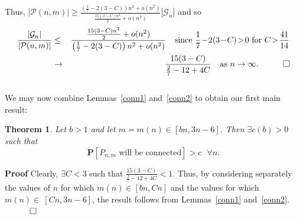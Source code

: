 \documentclass{article}
\newtheorem{Theorem}{Theorem}
\newtheorem{Proof of Theorem}{Proof of Theorem}
\begin{document}
Thus,
$|\mathcal{P}(n,m)| \geq
\frac{(\frac{1}{7} - 2(3-C))n^{2} + o \left( n^{2} \right)}{ \frac{15(3-C)n^{2}}{2} + o \left( n^{2} \right)}
|\mathcal{G}_{n}|$
and so
\begin{eqnarray*}
\frac{|\mathcal{G}_{n}|}{|\mathcal{P}(n,m)|} & \leq & \frac{\frac{15(3-C)n^{2}}{2} + o(n^{2})}
{\left( \frac{1}{7}-2(3-C) \right) n^{2} + o(n^{2})} 
\phantom{w} \textrm{ since }
\frac{1}{7} \!-\! 2(3\!-\!C) \!>\! 0 \textrm{ for } C \!>\! \frac{41}{14} \\
& \to & \frac{15(3-C)}{\frac{2}{7} - 12 + 4C} \phantom{w} \textrm{ as } n \to \infty.
\phantom{qwerty}
\setlength{\unitlength}{.25cm}
\begin{picture}(1,1)
\put(0,0){\line(1,0){1}}
\put(0,0){\line(0,1){1}}
\put(1,1){\line(-1,0){1}}
\put(1,1){\line(0,-1){1}}
\end{picture}
\end{eqnarray*} \\















We may now combine Lemmas~\ref{conn1} and~\ref{conn2}
to obtain our first main result:















\begin{Theorem} \label{conn4}
Let $b>1$ and let $m=m(n) \in [bn, 3n-6]$. Then $\exists c(b) > 0$ such that 
\begin{displaymath}
\mathbf{P}[P_{n,m} \textrm{ will be connected}] > c \textrm{  } \forall n.
\end{displaymath}
\end{Theorem}
\textbf{Proof}
Clearly, $\exists C<3$ such that $\frac{15(3-C)}{\frac{2}{7} - 12 + 4C} < 1$.
Thus, by considering separately the values of $n$ for which $m(n) \in [bn,Cn]$
and the values for which $m(n) \in~[Cn,3n-6]$,
the result follows from Lemmas~\ref{conn1} and~\ref{conn2}.
$\phantom{qwerty}
\setlength{\unitlength}{.25cm}
\begin{picture}(1,1)
\put(0,0){\line(1,0){1}}
\put(0,0){\line(0,1){1}}
\put(1,1){\line(-1,0){1}}
\put(1,1){\line(0,-1){1}}
\end{picture}$
\begin{displaymath}
\end{displaymath} 
\end{document}
